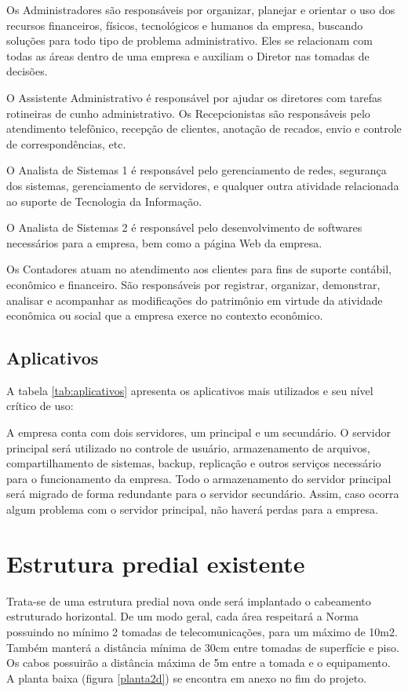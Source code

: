 \documentclass[	DIV=calc,%
							paper=a4,%
							fontsize=12pt,%
							onecolumn]{scrartcl}	 					%
\begin{document}
Os Administradores são responsáveis por organizar, planejar e orientar o uso dos recursos financeiros, físicos, tecnológicos e humanos da empresa, buscando soluções para todo tipo de problema administrativo. Eles se relacionam com todas as áreas dentro de uma empresa e auxiliam o Diretor nas tomadas de decisões.

O Assistente Administrativo é responsável por ajudar os diretores com tarefas rotineiras de cunho administrativo.
Os Recepcionistas são responsáveis pelo atendimento telefônico, recepção de clientes, anotação de recados, envio e controle de correspondências, etc.

O Analista de Sistemas 1 é responsável pelo gerenciamento de redes, segurança dos sistemas, gerenciamento de servidores, e qualquer outra atividade relacionada ao suporte de Tecnologia da Informação.

O Analista de Sistemas 2 é responsável pelo desenvolvimento de softwares necessários para a empresa, bem como a página Web da empresa.

Os Contadores atuam no atendimento aos clientes para fins de suporte contábil, econômico e financeiro. São responsáveis por registrar, organizar, demonstrar, analisar e acompanhar as modificações do patrimônio em virtude da atividade econômica ou social que a empresa exerce no contexto econômico.

\subsection{Aplicativos}

A tabela \ref{tab:aplicativos} apresenta os aplicativos mais utilizados e seu nível crítico de uso:



A empresa conta com dois servidores, um principal e um secundário. O servidor principal será utilizado no controle de usuário, armazenamento de arquivos, compartilhamento de sistemas, backup, replicação e outros serviços necessário para o funcionamento da empresa. Todo o armazenamento do servidor principal será migrado de forma redundante para o servidor secundário. Assim, caso ocorra algum problema com o servidor principal, não haverá perdas para a empresa.


\section{Estrutura predial existente}

Trata-se de uma estrutura predial nova onde será implantado o cabeamento estruturado horizontal. De um modo geral, cada área respeitará a Norma possuindo no mínimo 2 tomadas de telecomunicações, para um máximo de 10m2. Também manterá a distância mínima de 30cm entre tomadas de superfície e piso. Os cabos possuirão a distância máxima de 5m entre a tomada e o equipamento. A planta baixa (figura \ref{planta2d}) se encontra em anexo no fim do projeto. 
\end{document}
